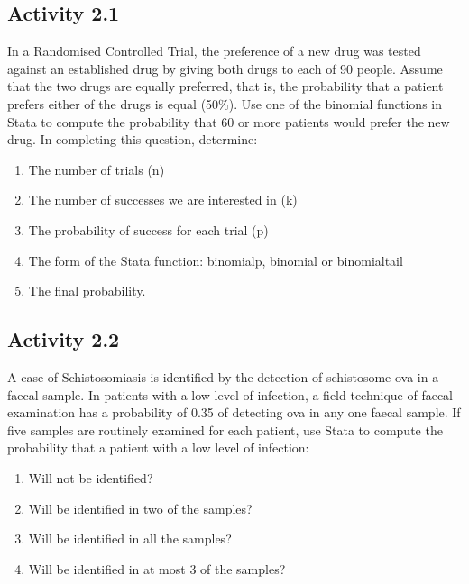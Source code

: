 \documentclass[
]{memoir}
\providecommand{\tightlist}{%
  \setlength{\itemsep}{0pt}\setlength{\parskip}{0pt}}
\begin{document}
\hypertarget{activity-2.1}{%
\subsection*{Activity 2.1}\label{activity-2.1}}

In a Randomised Controlled Trial, the preference of a new drug was tested against an established drug by giving both drugs to each of 90 people. Assume that the two drugs are equally preferred, that is, the probability that a patient prefers either of the drugs is equal (50\%). Use one of the binomial functions in Stata to compute the probability that 60 or more patients would prefer the new drug. In completing this question, determine:

\begin{enumerate}
\def\labelenumi{\alph{enumi})}
\tightlist
\item
  The number of trials (n)
\item
  The number of successes we are interested in (k)
\item
  The probability of success for each trial (p)
\item
  The form of the Stata function: binomialp, binomial or binomialtail
\item
  The final probability.
\end{enumerate}

\hypertarget{activity-2.2}{%
\subsection*{Activity 2.2}\label{activity-2.2}}

A case of Schistosomiasis is identified by the detection of schistosome ova in a faecal sample. In patients with a low level of infection, a field technique of faecal examination has a probability of 0.35 of detecting ova in any one faecal sample. If five samples are routinely examined for each patient, use Stata to compute the probability that a patient with a low level of infection:

\begin{enumerate}
\def\labelenumi{\alph{enumi})}
\tightlist
\item
  Will not be identified?
\item
  Will be identified in two of the samples?
\item
  Will be identified in all the samples?
\item
  Will be identified in at most 3 of the samples?
\end{enumerate}
\end{document}
